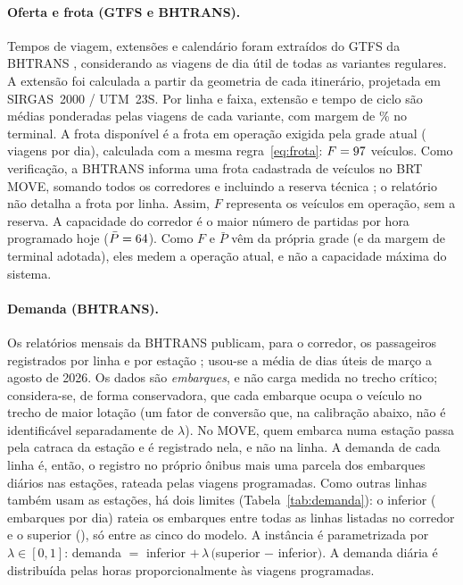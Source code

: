 \documentclass[11pt,a4paper]{article}
\newcommand{\tabela}[1]{\resizebox{\ifdim\width>\textwidth\textwidth\else\width\fi}{!}{}}
\begin{document}
\paragraph{Oferta e frota (GTFS e BHTRANS).}
Tempos de viagem, extensões e calendário foram extraídos do GTFS da BHTRANS
\citep{gtfsbhtrans}, considerando as viagens de dia útil de todas as variantes
regulares. A extensão foi calculada a partir da geometria de cada itinerário,
projetada em SIRGAS~2000 / UTM~23S. Por linha e faixa, extensão e tempo de ciclo
são médias ponderadas pelas viagens de cada variante, com margem de
\margemTerminal\% no terminal. A frota disponível é a frota em operação exigida
pela grade atual (\viagensGTFS{} viagens por dia), calculada com a mesma
regra~\eqref{eq:frota}: $F=97$ veículos. Como verificação, a BHTRANS
informa uma frota cadastrada de \frotaMOVE{} veículos no BRT MOVE, somando todos
os corredores e incluindo a reserva técnica \citep{bhtrans2026}; o relatório não
detalha a frota por linha. Assim, $F$ representa os veículos em operação,
sem a reserva. A capacidade do corredor é o maior número de partidas por hora
programado hoje ($\bar{P}=64$). Como $F$ e $\bar{P}$ vêm da própria
grade (e da margem de terminal adotada), eles medem a operação atual, e não a
capacidade máxima do sistema.

\begin{table}[htbp]
\centering
\caption{Parâmetros por linha (GTFS) e demanda na instância calibrada.}
\label{tab:parametros}
\small
\tabela{tabelas/parametros_linhas.tex}
\end{table}

\paragraph{Demanda (BHTRANS).}
Os relatórios mensais da BHTRANS publicam, para o corredor, os passageiros
registrados por linha e por estação \citep{bhtrans2026}; usou-se a média de dias
úteis de março a agosto de 2026. Os dados são \emph{embarques}, e não carga
medida no trecho crítico; considera-se, de forma conservadora, que cada
embarque ocupa o veículo no trecho de maior lotação (um fator de conversão que,
na calibração abaixo, não é identificável separadamente de $\lambda$). No MOVE,
quem embarca numa estação passa pela catraca da estação e é registrado nela, e
não na linha. A demanda de cada linha é, então, o registro no próprio ônibus
mais uma parcela dos \embarquesEstacoes{} embarques diários nas estações,
rateada pelas viagens programadas. Como outras linhas também usam as estações,
há dois limites (Tabela~\ref{tab:demanda}): o inferior (\demandaInf{} embarques
por dia) rateia os embarques entre todas as linhas listadas no corredor e o
superior (\demandaSup{}), só entre as cinco do modelo. A instância é
parametrizada por $\lambda\in[0,1]$: demanda $=$ inferior $+\,\lambda\,($superior
$-$ inferior$)$. A demanda diária é distribuída pelas horas proporcionalmente às
viagens programadas.
\end{document}
